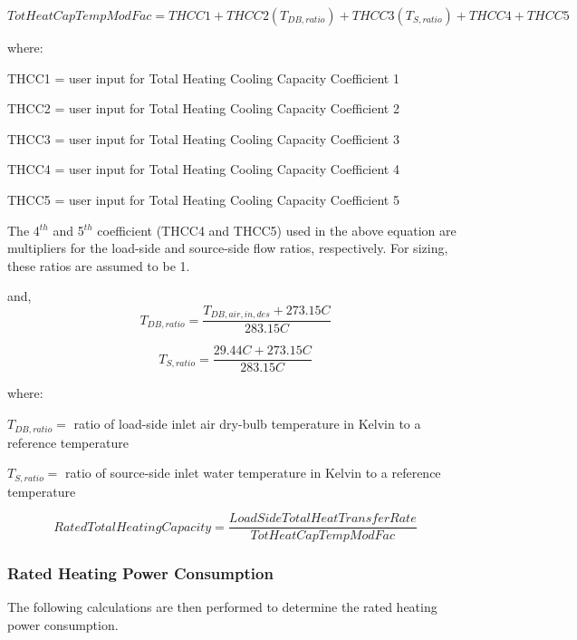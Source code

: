 \begin{equation}
TotHeatCapTempModFac = THCC1 + THCC2\left( {{T_{DB,ratio}}} \right) + THCC3\left( {{T_{S,ratio}}} \right) + THCC4 + THCC5
\end{equation}

where:

THCC1 = user input for Total Heating Cooling Capacity Coefficient 1

THCC2 = user input for Total Heating Cooling Capacity Coefficient 2

THCC3 = user input for Total Heating Cooling Capacity Coefficient 3

THCC4 = user input for Total Heating Cooling Capacity Coefficient 4

THCC5 = user input for Total Heating Cooling Capacity Coefficient 5


The 4\(^{th}\) and 5\(^{th}\) coefficient (THCC4 and THCC5) used in the above equation are multipliers for the load-side and source-side flow ratios, respectively. For sizing, these ratios are assumed to be 1.

and,
\begin{equation}
  T_{DB,ratio} = \frac{T_{DB,air,in,des}+273.15C}{283.15C}
\end{equation}

\begin{equation}
  T_{S,ratio} = \frac{29.44C+273.15C}{283.15C}
\end{equation}

where:
 
$T_{DB,ratio} = $ ratio of load-side inlet air dry-bulb temperature in Kelvin to a reference temperature


$T_{S,ratio} = $ ratio of source-side inlet water temperature in Kelvin to a reference temperature


\begin{equation}
  {Rated Total Heating Capacity}   = \frac{Load Side Total Heat Transfer Rate}{TotHeatCapTempModFac} 
\end{equation}


\subsubsection{Rated Heating Power Consumption}\label{rated-heating-power-consumption}

The following calculations are then performed to determine the rated heating power consumption.


